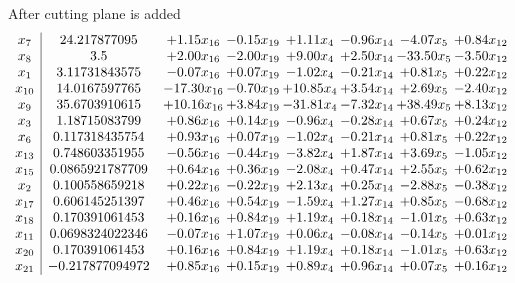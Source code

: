 \documentclass[8pt]{article}
\begin{document}
 After cutting plane is added 
\[\begin{array}{c| c c@{\hskip 2pt} c@{\hskip 2pt} c@{\hskip 2pt} c@{\hskip 2pt} c@{\hskip 2pt} c@{\hskip 2pt} }
 x_{7}   &  24.217877095 & +  1.15 x_{16} & -0.15 x_{19} & +  1.11 x_{4} & -0.96 x_{14} & -4.07 x_{5} & +  0.84 x_{12}\\
 x_{8}   &  3.5 & +  2.00 x_{16} & -2.00 x_{19} & +  9.00 x_{4} & +  2.50 x_{14} & -33.50 x_{5} & -3.50 x_{12}\\
 x_{1}   &  3.11731843575 & -0.07 x_{16} & +  0.07 x_{19} & -1.02 x_{4} & -0.21 x_{14} & +  0.81 x_{5} & +  0.22 x_{12}\\
 x_{10}   &  14.0167597765 & -17.30 x_{16} & -0.70 x_{19} & + 10.85 x_{4} & +  3.54 x_{14} & +  2.69 x_{5} & -2.40 x_{12}\\
 x_{9}   &  35.6703910615 & + 10.16 x_{16} & +  3.84 x_{19} & -31.81 x_{4} & -7.32 x_{14} & + 38.49 x_{5} & +  8.13 x_{12}\\
 x_{3}   &  1.18715083799 & +  0.86 x_{16} & +  0.14 x_{19} & -0.96 x_{4} & -0.28 x_{14} & +  0.67 x_{5} & +  0.24 x_{12}\\
 x_{6}   &  0.117318435754 & +  0.93 x_{16} & +  0.07 x_{19} & -1.02 x_{4} & -0.21 x_{14} & +  0.81 x_{5} & +  0.22 x_{12}\\
 x_{13}   &  0.748603351955 & -0.56 x_{16} & -0.44 x_{19} & -3.82 x_{4} & +  1.87 x_{14} & +  3.69 x_{5} & -1.05 x_{12}\\
 x_{15}   &  0.0865921787709 & +  0.64 x_{16} & +  0.36 x_{19} & -2.08 x_{4} & +  0.47 x_{14} & +  2.55 x_{5} & +  0.62 x_{12}\\
 x_{2}   &  0.100558659218 & +  0.22 x_{16} & -0.22 x_{19} & +  2.13 x_{4} & +  0.25 x_{14} & -2.88 x_{5} & -0.38 x_{12}\\
 x_{17}   &  0.606145251397 & +  0.46 x_{16} & +  0.54 x_{19} & -1.59 x_{4} & +  1.27 x_{14} & +  0.85 x_{5} & -0.68 x_{12}\\
 x_{18}   &  0.170391061453 & +  0.16 x_{16} & +  0.84 x_{19} & +  1.19 x_{4} & +  0.18 x_{14} & -1.01 x_{5} & +  0.63 x_{12}\\
 x_{11}   &  0.0698324022346 & -0.07 x_{16} & +  1.07 x_{19} & +  0.06 x_{4} & -0.08 x_{14} & -0.14 x_{5} & +  0.01 x_{12}\\
 x_{20}   &  0.170391061453 & +  0.16 x_{16} & +  0.84 x_{19} & +  1.19 x_{4} & +  0.18 x_{14} & -1.01 x_{5} & +  0.63 x_{12}\\
 x_{21}   &  -0.217877094972 & +  0.85 x_{16} & +  0.15 x_{19} & +  0.89 x_{4} & +  0.96 x_{14} & +  0.07 x_{5} & +  0.16 x_{12}\\

\end{array}\]
\end{document}
